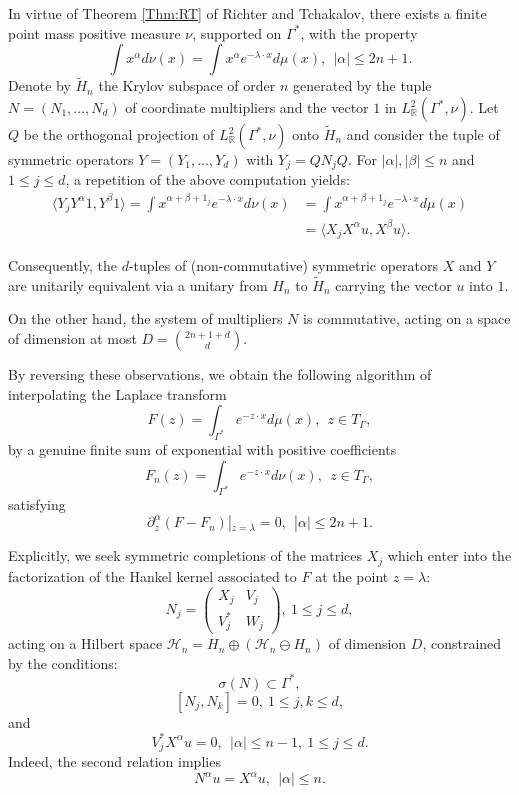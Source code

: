 \documentclass[11pt,reqno]{amsart}
\theoremstyle{plain}
\theoremstyle{definition}
\numberwithin{equation}{section}
\begin{document}
	In virtue of Theorem \ref{Thm:RT} of Richter and Tchakalov, there exists a finite point mass positive measure $\nu$, supported on $\Gamma^\ast$, with the property
	$$ \int x^\alpha d\nu(x) = \int x^\alpha e^{- \lambda \cdot x} d\mu(x), \ \ |\alpha| \leq 2n+1.$$ Denote by $\tilde{H}_n$ the Krylov subspace of order $n$ generated by the 
	tuple $N=(N_1, \dots, N_d)$ of coordinate multipliers and the vector $1$ in $L_\mathbb{R}^2(\Gamma^*, \nu)$. Let $Q$ be the orthogonal projection of $L_\mathbb{R}^2(\Gamma^*, \nu)$ onto $\tilde{H}_n$ and consider the tuple of symmetric operators $Y=(Y_1, \dots, Y_d)$ with
	$Y_j = QN_jQ$. For $|\alpha|, |\beta| \leq n$ and $1 \leq j \leq d$, a repetition of the above computation yields:
    \begin{align*}
    \langle Y_j Y^\alpha 1, Y^\beta 1 \rangle =  \int x^{\alpha + \beta + 1_j} e^{- \lambda \cdot x} d\nu(x) 
    &= \int x^{\alpha + \beta + 1_j} e^{- \lambda \cdot x} d\mu(x) \\
    &=  \langle X_j X^\alpha u , X^\beta u \rangle. 
    \end{align*}
	
	Consequently, the $d$-tuples of (non-commutative) symmetric operators $X$ and $Y$ are unitarily equivalent via a unitary from $H_n$ to $\tilde{H}_n$ carrying the vector $u$ into $1$.
	
	On the other hand, the system of multipliers $N$ is commutative, acting on a space of dimension at most $ D = \binom{2n+1 + d}{d}$.
	
	By reversing these observations, we obtain the following algorithm of interpolating the Laplace transform
	$$ F(z) = \int_{\Gamma^*} e^{- z\cdot x} d\mu(x), \ \ z\in T_\Gamma,$$
	by a genuine finite sum of exponential with positive coefficients
	$$ F_n(z) = \int_{\Gamma^*} e^{- z\cdot x} d\nu(x), \ \ z\in T_\Gamma,$$
	satisfying
	$$ \partial_z^\alpha (F-F_n)|_{z=\lambda} = 0, \ \ |\alpha| \leq 2n+1.$$
	
	Explicitly, we seek symmetric completions of the matrices $X_j$ which enter into the factorization of the Hankel kernel associated to $F$ at the point $z = \lambda$:
	$$ N_j = \begin{pmatrix} X_j & V_j\\ V_j^\ast & W_j\end{pmatrix}, \ 1 \leq j \leq d,$$
	acting on a Hilbert space $\mathcal{H}_n = H_n \oplus (\mathcal{H}_n \ominus H_n)$  of dimension $D$, constrained by the conditions: 
        $$ \sigma(N) \subset \Gamma^\ast,$$
	$$ [N_j , N_k ] = 0, \ 1 \leq j,k \leq d,$$
	and
	$$ V_j^\ast X^{\alpha} u = 0, \ \ |\alpha| \leq n-1, \ 1 \leq j \leq d.$$
	Indeed, the second relation implies 
	$$ N^\alpha u = X^\alpha u, \ \ |\alpha| \leq n.$$
	
\end{document}

